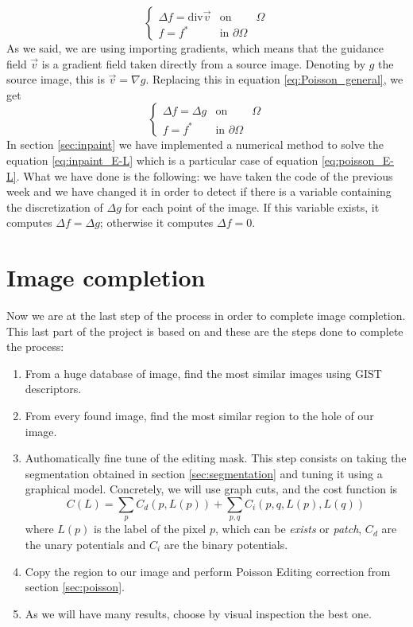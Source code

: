 \documentclass[10pt,a4paper]{llncs}
\begin{document}
\begin{equation}
\left\{\begin{matrix}
 \Delta f=\text{div} \overrightarrow{v} & \text{on } & \Omega\\ 
 f=f^{*}& \text{in }\partial\Omega
\end{matrix}\right.
\label{eq:Poisson_general}
\end{equation}
\noindent
As we said, we are using importing gradients, which means that the guidance field $\overrightarrow{v}$ is a gradient field taken directly from a source image. Denoting by $g$ the source image, this is $\overrightarrow{v} = \nabla g.$ Replacing this in equation \ref{eq:Poisson_general}, we get
\begin{equation}
\left\{\begin{matrix}
 \Delta f=\Delta g & \text{on } & \Omega\\ 
 f=f^{*}& \text{in }\partial\Omega
\end{matrix}\right.
\label{eq:poisson_E-L}
\end{equation}
In section \ref{sec:inpaint} we have implemented a numerical method to solve the equation \ref{eq:inpaint_E-L} which is a particular case of equation  \ref{eq:poisson_E-L}. What we have done is the following: we have taken the code of the previous week and we have changed it in order to detect if there is a variable containing the discretization of $\Delta g$ for each point of the image. If this variable exists, it computes $\Delta f = \Delta g$; otherwise it computes $\Delta f = 0$.
\section{Image completion}\label{sec:completion}
Now we are at the last step of the process in order to complete image completion. This last part of the project is based on \cite{hays2008scene} and these are the steps done to complete the process:
\begin{enumerate}
\item From a huge database of image, find the most similar images using GIST descriptors.
\item From every found image, find the most similar region to the hole of our image.
\item Authomatically fine tune of the editing mask. This step consists on taking the segmentation obtained in section \ref{sec:segmentation} and tuning it using a graphical model. Concretely, we will use graph cuts, and the cost function is
\begin{equation}
C(L) = \sum_pC_d(p, L(p)) + \sum_{p, q}C_i(p, q, L(p), L(q))
\end{equation}
where $L(p)$ is the label of the pixel $p$, which can be \emph{exists} or \emph{patch}, $C_d$ are the unary potentials and $C_i$ are the binary potentials.
\item Copy the region to our image and perform Poisson Editing correction from section \ref{sec:poisson}.
\item As we will have many results, choose by visual inspection the best one.
\end{enumerate}
\end{document}
